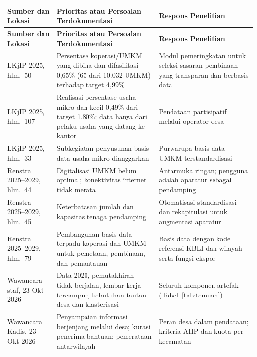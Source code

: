 \documentclass[12pt,a4paper]{report}
\begin{document}
\vspace{1em}
{\footnotesize
\setlength{\tabcolsep}{4pt}
\renewcommand{\arraystretch}{1.15}
\begin{longtable}{|L{0.18\textwidth}|L{0.37\textwidth}|L{0.37\textwidth}|}
\hline
\textbf{Sumber dan Lokasi} & \textbf{Prioritas atau Persoalan Terdokumentasi} & \textbf{Respons Penelitian} \\ \hline
\endfirsthead
\hline
\textbf{Sumber dan Lokasi} & \textbf{Prioritas atau Persoalan Terdokumentasi} & \textbf{Respons Penelitian} \\ \hline
\endhead
LKjIP 2025, hlm.~50 \cite{lkjip2025toba} & Persentase koperasi/UMKM yang dibina dan difasilitasi 0,65\% (65 dari 10.032 UMKM) terhadap target 4,99\% & Modul pemeringkatan untuk seleksi sasaran pembinaan yang transparan dan berbasis data \\ \hline
LKjIP 2025, hlm.~107 \cite{lkjip2025toba} & Realisasi persentase usaha mikro dan kecil 0,49\% dari target 1,80\%; data hanya dari pelaku usaha yang datang ke kantor & Pendataan partisipatif melalui operator desa \\ \hline
LKjIP 2025, hlm.~33 \cite{lkjip2025toba} & Subkegiatan penyusunan basis data usaha mikro dianggarkan & Purwarupa basis data UMKM terstandardisasi \\ \hline
Renstra 2025--2029, hlm.~44 \cite{renstra2025toba} & Digitalisasi UMKM belum optimal; konektivitas internet tidak merata & Antarmuka ringan; pengguna adalah aparatur sebagai pendamping \\ \hline
Renstra 2025--2029, hlm.~45 \cite{renstra2025toba} & Keterbatasan jumlah dan kapasitas tenaga pendamping & Otomatisasi standardisasi dan rekapitulasi untuk augmentasi aparatur \\ \hline
Renstra 2025--2029, hlm.~79 \cite{renstra2025toba} & Pembangunan basis data terpadu koperasi dan UMKM untuk pemetaan, pembinaan, dan pemantauan & Basis data dengan kode referensi KBLI dan wilayah serta fungsi ekspor \\ \hline
Wawancara staf, 23 Okt 2026 \cite{wawancarastaf2026} & Data 2020, pemutakhiran tidak berjalan, lembar kerja tercampur, kebutuhan tautan desa dan klasterisasi & Seluruh komponen artefak (Tabel~\ref{tab:temuan}) \\ \hline
Wawancara Kadis, 23 Okt 2026 \cite{wawancarakadis2026} & Penyampaian informasi berjenjang melalui desa; kurasi penerima bantuan; pemerataan antarwilayah & Peran desa dalam pendataan; kriteria AHP dan kuota per kecamatan \\ \hline
\end{longtable}
}
\end{document}
